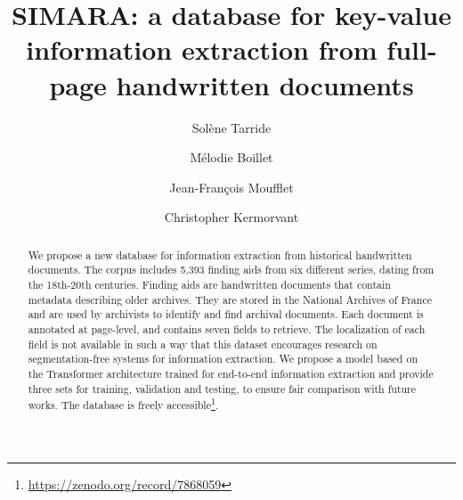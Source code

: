 \documentclass[runningheads]{llncs}
\begin{document}
\title{SIMARA: a database for key-value information extraction from full-page handwritten documents}
\author{Solène Tarride \and
Mélodie Boillet \and
Jean-François Moufflet \and
Christopher Kermorvant 
}
\maketitle              



\begin{abstract}


We propose a new database for information extraction from historical handwritten documents. The corpus includes 5,393 finding aids from six different series, dating from the 18th-20th centuries. Finding aids are handwritten documents that contain metadata describing older archives. They are stored in the National Archives of France and are used by archivists to identify and find archival documents. 
Each document is annotated at page-level, and contains seven fields to retrieve. The localization of each field is not available in such a way that this dataset encourages research on segmentation-free systems for information extraction.
We propose a model based on the Transformer architecture trained for end-to-end information extraction and provide three sets for training, validation and testing, to ensure fair comparison with future works. The database is freely accessible\footnote{\url{https://zenodo.org/record/7868059}}.

\end{abstract}
\end{document}
